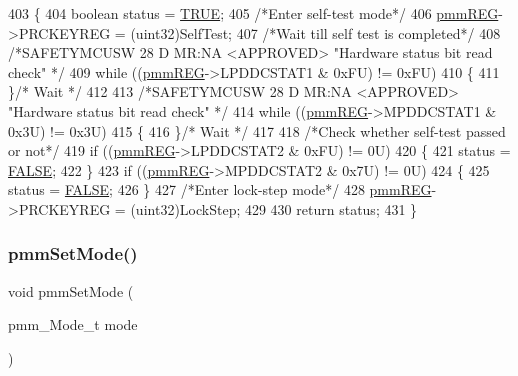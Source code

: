 \begin{DoxyCode}
403 \{
404     \textcolor{keywordtype}{boolean} status = \mbox{\hyperlink{hal__stdtypes_8h_aa8cecfc5c5c054d2875c03e77b7be15d}{TRUE}};
405     \textcolor{comment}{/*Enter self-test mode*/}
406     \mbox{\hyperlink{reg__pmm_8h_a57b193bea1bf1951b97bdfee07f48598}{pmmREG}}->PRCKEYREG = (uint32)SelfTest;
407     \textcolor{comment}{/*Wait till self test is completed*/}
408     \textcolor{comment}{/*SAFETYMCUSW 28 D MR:NA <APPROVED> "Hardware status bit read check" */}
409     \textcolor{keywordflow}{while} ((\mbox{\hyperlink{reg__pmm_8h_a57b193bea1bf1951b97bdfee07f48598}{pmmREG}}->LPDDCSTAT1 & 0xFU) != 0xFU)
410     \{ 
411     \}\textcolor{comment}{/* Wait */}                 
412     
413     \textcolor{comment}{/*SAFETYMCUSW 28 D MR:NA <APPROVED> "Hardware status bit read check" */}
414     \textcolor{keywordflow}{while} ((\mbox{\hyperlink{reg__pmm_8h_a57b193bea1bf1951b97bdfee07f48598}{pmmREG}}->MPDDCSTAT1 & 0x3U) != 0x3U)
415     \{ 
416     \}\textcolor{comment}{/* Wait */}   
417 
418     \textcolor{comment}{/*Check whether self-test passed or not*/}
419     \textcolor{keywordflow}{if} ((\mbox{\hyperlink{reg__pmm_8h_a57b193bea1bf1951b97bdfee07f48598}{pmmREG}}->LPDDCSTAT2 & 0xFU) != 0U)
420     \{
421         status = \mbox{\hyperlink{hal__stdtypes_8h_aa93f0eb578d23995850d61f7d61c55c1}{FALSE}};
422     \}
423     \textcolor{keywordflow}{if} ((\mbox{\hyperlink{reg__pmm_8h_a57b193bea1bf1951b97bdfee07f48598}{pmmREG}}->MPDDCSTAT2 & 0x7U) != 0U)
424     \{
425         status = \mbox{\hyperlink{hal__stdtypes_8h_aa93f0eb578d23995850d61f7d61c55c1}{FALSE}};
426     \}
427     \textcolor{comment}{/*Enter lock-step mode*/}
428     \mbox{\hyperlink{reg__pmm_8h_a57b193bea1bf1951b97bdfee07f48598}{pmmREG}}->PRCKEYREG = (uint32)LockStep;
429 
430     \textcolor{keywordflow}{return} status;
431 \}
\end{DoxyCode}
\mbox{\label{group__PMM_gafd3767acd1dd35ef877091fe303b08b6}} 
\subsubsection{\texorpdfstring{pmm\+Set\+Mode()}{pmmSetMode()}}
{\footnotesize\ttfamily void pmm\+Set\+Mode (\begin{DoxyParamCaption}\item[{pmm\+\_\+\+Mode\+\_\+t}]{mode }\end{DoxyParamCaption})}




